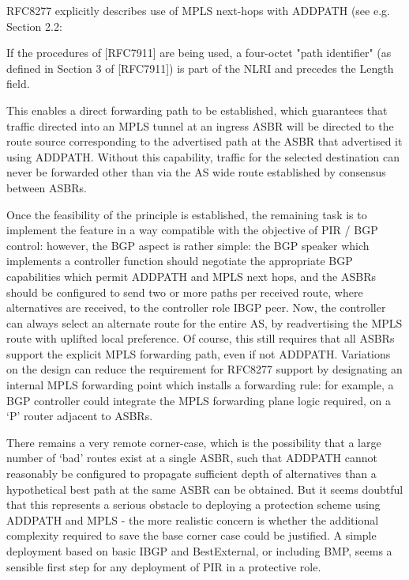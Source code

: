 RFC8277 explicitly describes use of MPLS next-hops with ADDPATH (see e.g. Section 2.2:
\begin{myquote}
	If the procedures of [RFC7911] are being used, a four-octet "path
	identifier" (as defined in Section 3 of [RFC7911]) is part of the
	NLRI and precedes the Length field.
\end{myquote}

This enables a direct forwarding path to be established, which guarantees that traffic directed into an MPLS tunnel at an ingress ASBR will be directed to the route source corresponding to the advertised path at the ASBR that advertised it using ADDPATH.  Without this capability,  traffic for the selected destination can never be forwarded other than via the AS wide route established by consensus between ASBRs.

Once the feasibility of the principle is established, the remaining task is to implement the feature in a way compatible with the objective of PIR / BGP control: however, the BGP aspect is rather simple: the BGP speaker which implements a controller function should negotiate the appropriate BGP capabilities which permit ADDPATH and MPLS next hops, and the ASBRs should be configured to send two or more paths per received route, where alternatives are received, to the controller role IBGP peer.  Now, the controller can always select an alternate route for the entire AS, by readvertising the MPLS route with uplifted local preference.  Of course, this still requires that all ASBRs support the explicit MPLS forwarding path, even if not ADDPATH.
Variations on the design can reduce the requirement for RFC8277 support by designating an internal MPLS forwarding point which installs a forwarding rule: for example, a BGP controller could integrate the MPLS forwarding plane logic required, on a `P' router adjacent to ASBRs.

There remains a very remote corner-case, which is the possibility that a large number of `bad' routes exist at a single ASBR, such that ADDPATH cannot reasonably be configured to propagate sufficient depth of alternatives than a hypothetical best path at the same ASBR can be obtained.  But it seems doubtful that this represents a serious obstacle to deploying a protection scheme using ADDPATH and MPLS - the more realistic concern is whether the additional complexity required to save the base corner case could be justified.  A simple deployment based on basic IBGP and BestExternal, or including BMP, seems a sensible first step for any deployment of PIR in a protective role.

